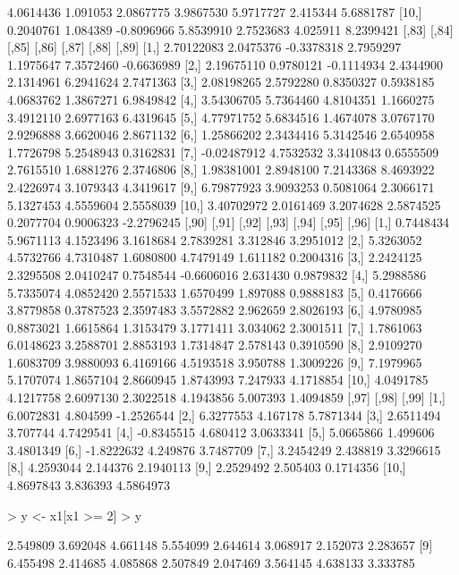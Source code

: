 \documentclass[12pt]{article}
\begin{document}
\begin{Schunk}
\begin{Soutput}
 [9,] 4.0614436  1.091053  2.0867775  3.9867530 5.9717727 2.415344  5.6881787
[10,] 0.2040761  1.084389 -0.8096966  5.8539910 2.7523683 4.025911  8.2399421
            [,83]     [,84]      [,85]     [,86]     [,87]     [,88]      [,89]
 [1,]  2.70122083 2.0475376 -0.3378318 2.7959297 1.1975647 7.3572460 -0.6636989
 [2,]  2.19675110 0.9780121 -0.1114934 2.4344900 2.1314961 6.2941624  2.7471363
 [3,]  2.08198265 2.5792280  0.8350327 0.5938185 4.0683762 1.3867271  6.9849842
 [4,]  3.54306705 5.7364460  4.8104351 1.1660275 3.4912110 2.6977163  6.4319645
 [5,]  4.77971752 5.6834516  1.4674078 3.0767170 2.9296888 3.6620046  2.8671132
 [6,]  1.25866202 2.3434416  5.3142546 2.6540958 1.7726798 5.2548943  0.3162831
 [7,] -0.02487912 4.7532532  3.3410843 0.6555509 2.7615510 1.6881276  2.3746806
 [8,]  1.98381001 2.8948100  7.2143368 8.4693922 2.4226974 3.1079343  4.3419617
 [9,]  6.79877923 3.9093253  0.5081064 2.3066171 5.1327453 4.5559604  2.5558039
[10,]  3.40702972 2.0161469  3.2074628 2.5874525 0.2077704 0.9006323 -2.2796245
          [,90]     [,91]     [,92]     [,93]      [,94]    [,95]     [,96]
 [1,] 0.7448434 5.9671113 4.1523496 3.1618684  2.7839281 3.312846 3.2951012
 [2,] 5.3263052 4.5732766 4.7310487 1.6080800  4.7479149 1.611182 0.2004316
 [3,] 2.2424125 2.3295508 2.0410247 0.7548544 -0.6606016 2.631430 0.9879832
 [4,] 5.2988586 5.7335074 4.0852420 2.5571533  1.6570499 1.897088 0.9888183
 [5,] 0.4176666 3.8779858 0.3787523 2.3597483  3.5572882 2.962659 2.8026193
 [6,] 4.9780985 0.8873021 1.6615864 1.3153479  3.1771411 3.034062 2.3001511
 [7,] 1.7861063 6.0148623 3.2588701 2.8853193  1.7314847 2.578143 0.3910590
 [8,] 2.9109270 1.6083709 3.9880093 6.4169166  4.5193518 3.950788 1.3009226
 [9,] 7.1979965 5.1707074 1.8657104 2.8660945  1.8743993 7.247933 4.1718854
[10,] 4.0491785 4.1217758 2.6097130 2.3022518  4.1943856 5.007393 1.4094859
           [,97]    [,98]      [,99]
 [1,]  6.0072831 4.804599 -1.2526544
 [2,]  6.3277553 4.167178  5.7871344
 [3,]  2.6511494 3.707744  4.7429541
 [4,] -0.8345515 4.680412  3.0633341
 [5,]  5.0665866 1.499606  3.4801349
 [6,] -1.8222632 4.249876  3.7487709
 [7,]  3.2454249 2.438819  3.3296615
 [8,]  4.2593044 2.144376  2.1940113
 [9,]  2.2529492 2.505403  0.1714356
[10,]  4.8697843 3.836393  4.5864973
\end{Soutput}
\begin{Sinput}
> y <- x1[x1 >= 2] 
> y
\end{Sinput}
\begin{Soutput}
  [1] 2.549809 3.692048 4.661148 5.554099 2.644614 3.068917 2.152073 2.283657
  [9] 6.455498 2.414685 4.085868 2.507849 2.047469 3.564145 4.638133 3.333785

\end{Soutput}
\end{Schunk}
\end{document}
